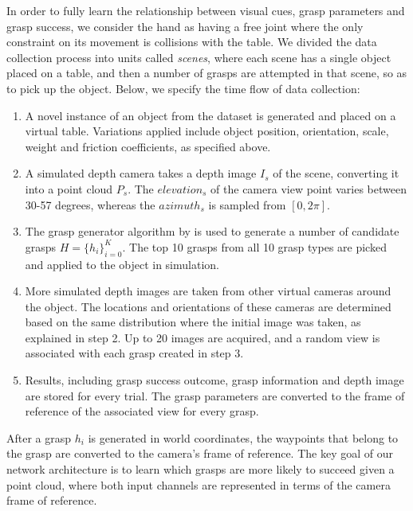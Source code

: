 In order to fully learn the relationship between visual cues, grasp parameters and grasp success, we  consider the hand as having a free joint where the only constraint on its movement is collisions with the table. We divided the data collection process into units called \textit{scenes}, where each scene has a single object placed on a table, and then a number of grasps are attempted in that scene, so as to pick up the object. Below, we specify the time flow of data collection:

\begin{enumerate}
\item A novel instance of an object from the dataset is generated and placed on a virtual table. Variations applied include object position, orientation, scale, weight and friction coefficients, as specified above. 
\item A simulated depth camera takes a depth image $I_s$ of the scene, converting it into a point cloud $P_s$. The ${elevation}_s$ of the camera view point varies between 30-57 degrees, whereas the ${azimuth}_s$ is sampled from $[0, 2\pi]$. 
\item The grasp generator algorithm by \citet{kopicki2015ijrr} is used to generate a number of candidate grasps $H = \{h_i\}_{i=0}^{K}$. The top 10 grasps from all 10 grasp types are picked and applied to the object in simulation.
\item More simulated depth images are taken from other virtual cameras around the object. The locations and orientations of these cameras are determined based on the same distribution where the initial image was taken, as explained in step 2. Up to 20 images are acquired, and a random view is associated with each grasp created in step 3. 
\item Results, including grasp success outcome, grasp information and depth image are stored for every trial. The grasp parameters are converted to the frame of reference of the associated view for every grasp.
\end{enumerate}


After a grasp $h_i$ is generated in world coordinates, the waypoints that belong to the grasp are converted to the camera's frame of reference. The key goal of our network architecture is to learn which grasps are more likely to succeed given a point cloud, where both input channels are represented in terms of the camera frame of reference. %


